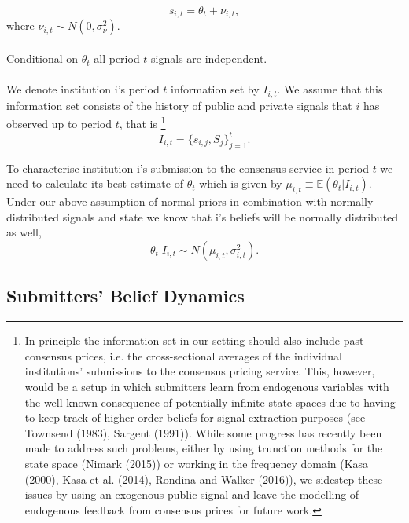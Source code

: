 \documentclass[a4,12pt]{article}
\begin{document}
\[ s_{i,t} = \theta_t + \nu_{i,t},\] 
where $\nu_{i,t} \sim N(0,\sigma_\nu^2)$.\\
\\
Conditional on $\theta_t$ all period $t$ signals are independent.\\
\\
We denote institution i's period $t$ information set by $I_{i,t}$. We assume that this information set consists of the history of public and private signals that $i$ has observed up to period $t$, that is \footnote{In principle the information set in our setting should also include past consensus prices, i.e. the cross-sectional averages of the individual institutions' submissions to the consensus pricing service. This, however, would be a setup in which submitters learn from endogenous variables with the well-known consequence of potentially infinite state spaces due to having to keep track of higher order beliefs for signal extraction purposes (see Townsend (1983), Sargent (1991)). While some progress has recently been made to address such problems, either by using trunction methods for the state space (Nimark (2015)) or working in the frequency domain (Kasa (2000), Kasa et al. (2014), Rondina and Walker (2016)), we sidestep these issues by using an exogenous public signal and leave the modelling of endogenous feedback from consensus prices for future work.}
\[ I_{i,t} = \{ s_{i,j}, S_j\}_{j=1}^t. \]

To characterise institution i's submission to the consensus service in period $t$ we need to calculate its best estimate of $\theta_t$ which is given by $\mu_{i,t} \equiv \mathbb{E}\left(\theta_t | I_{i,t} \right)$. Under our above assumption of normal priors in combination with normally distributed signals and state we know that i's beliefs will be normally distributed as well, 
\[ \theta_t | I_{i,t} \sim N(\mu_{i,t}, \sigma_{i,t}^2).\]

\subsection{Submitters' Belief Dynamics}
\end{document}
